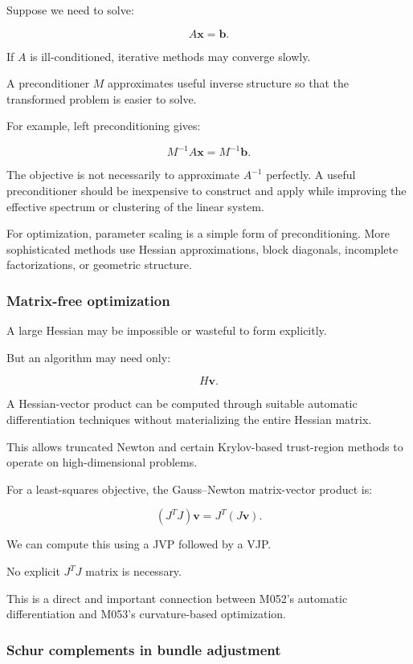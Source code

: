 Suppose we need to solve:

\[
A\mathbf x=\mathbf b.
\]

If \(A\) is ill-conditioned, iterative methods may converge slowly.

A preconditioner \(M\) approximates useful inverse structure so that the transformed problem is easier to solve.

For example, left preconditioning gives:

\[
M^{-1}A\mathbf x=M^{-1}\mathbf b.
\]

The objective is not necessarily to approximate \(A^{-1}\) perfectly. A useful preconditioner should be inexpensive to construct and apply while improving the effective spectrum or clustering of the linear system.

For optimization, parameter scaling is a simple form of preconditioning. More sophisticated methods use Hessian approximations, block diagonals, incomplete factorizations, or geometric structure.

\subsubsection{Matrix-free optimization}\label{02-foundations-ii-ch028-matrix-free-optimization}

A large Hessian may be impossible or wasteful to form explicitly.

But an algorithm may need only:

\[
H\mathbf v.
\]

A Hessian-vector product can be computed through suitable automatic differentiation techniques without materializing the entire Hessian matrix.

This allows truncated Newton and certain Krylov-based trust-region methods to operate on high-dimensional problems.

For a least-squares objective, the Gauss--Newton matrix-vector product is:

\[
\boxed{ (J^TJ)\mathbf v = J^T(J\mathbf v) }.
\]

We can compute this using a JVP followed by a VJP.

No explicit \(J^TJ\) matrix is necessary.

This is a direct and important connection between M052's automatic differentiation and M053's curvature-based optimization.

\subsubsection{Schur complements in bundle adjustment}\label{02-foundations-ii-ch028-schur-complements-in-bundle-adjustment}

